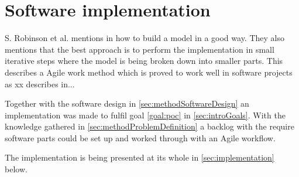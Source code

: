 \section{Software implementation}\label{sec:methodSoftwareImplementation}
S. Robinson et al. mentions in \cite{SecretsSuccessfulSimulation1995} how to build a model in a good way.
They also mentions that the best approach is to perform the implementation in small iterative steps where the model is being broken down into smaller parts.
This describes a Agile work method which is proved to work well in software projects as xx describes in...

\bigskip

Together with the software design in \cref{sec:methodSoftwareDesign} an implementation was made to fulfil goal \ref{goal:poc} in \cref{sec:introGoals}.
With the knowledge gathered in \cref{sec:methodProblemDefinition} a backlog with the require software parts could be set up and worked through with an Agile workflow.

\bigskip

The implementation is being presented at its whole in \cref{sec:implementation} below.
